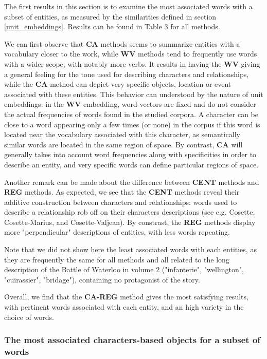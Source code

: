 \documentclass[
twocolumn,
]{ceurart}
\begin{document}
The first results in this section is to examine the most associated words with a subset of entities, as measured by the similarities defined in section \ref{unit_embeddings}. Results can be found in Table 3 for all methods.

We can first observe that \textbf{CA} methods seems to summarize entities with a vocabulary closer to the work, while \textbf{WV} methods tend to frequently use words with a wider scope, with notably more verbs. It results in having the \textbf{WV} giving a general feeling for the tone used for describing characters and relationships, while the \textbf{CA} method can depict very specific objects, location or event associated with these entities. This behavior can understood by the nature of unit embeddings: in the \textbf{WV} embedding, word-vectors are fixed and do not consider the actual frequencies of words found in the studied corpora. A character can be close to a word appearing only a few times (or none) in the corpus if this word is located near the vocabulary associated with this character, as semantically similar words are located in the same region of space. By contrast, \textbf{CA} will generally takes into account word frequencies along with specificities in order to describe an entity, and very specific words can define particular regions of space.

Another remark can be made about the difference between \textbf{CENT} methods and \textbf{REG} methods. As expected, we see that the \textbf{CENT} methods reveal their additive construction between characters and relationships: words used to describe a relationship rob off on their characters descriptions (see e.g. Cosette, Cosette-Marius, and Cosette-Valjean). By constrast, the \textbf{REG} methods display more "perpendicular" descriptions of entities, with less words repeating.   

Note that we did not show here the least associated words with each entities, as they are frequently the same for all methods and all related to the long description of the Battle of Waterloo in volume 2 ("infanterie", "wellington", "cuirassier", "bridage"), containing no protagonist of the story. 

Overall, we find that the \textbf{CA-REG} method gives the most satisfying results, with pertinent words associated with each entity, and an high variety in the choice of words. 
	
\subsubsection{The most associated characters-based objects for a subset of words}
\label{objects}
\end{document}
